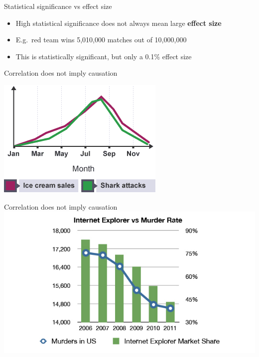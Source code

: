 \begin{frame}{Statistical significance vs effect size}
	\begin{itemize}
		\pause\item High statistical significance does not always mean large \textbf{effect size}
		\pause\item E.g.\ red team wins 5,010,000 matches out of 10,000,000
		\pause\item This is statistically significant, but only a 0.1\% effect size
	\end{itemize}
\end{frame}

\begin{frame}{Correlation does not imply causation}
	\pause
	\begin{center}
		\includegraphics[height=0.5\textheight]{shark_attacks}
	\end{center}
\end{frame}

\begin{frame}{Correlation does not imply causation}
	\includegraphics[width=\textwidth]{internet_explorer_murder_rate}
\end{frame}
